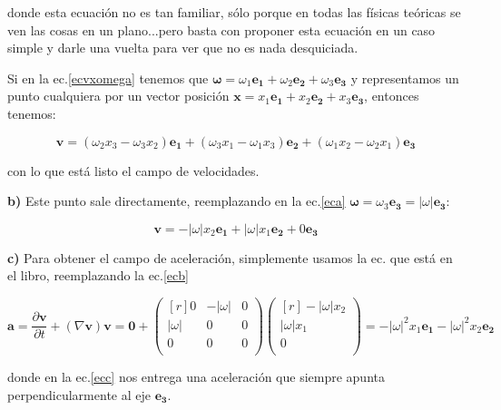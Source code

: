 \documentclass[10pt,a4paper]{article}
\begin{document}
\noindent donde esta ecuación no es tan familiar, sólo porque en todas las físicas teóricas se ven las cosas en un plano...pero basta con proponer esta ecuación en un caso simple y darle una vuelta para ver que no es nada desquiciada.

Si en la ec.\eqref{ecvxomega} tenemos que $\mathbf{\omega} =  \omega_1 \mathbf{e_1} + \omega_2 \mathbf{e_2} + \omega_3 \mathbf{e_3}$ y representamos un punto cualquiera por un vector posición $\mathbf{x} = x_1 \mathbf{e_1} + x_2 \mathbf{e_2} + x_3 \mathbf{e_3}$, entonces tenemos:

\begin{equation}\label{eca}
\mathbf{v} = (\omega_2 x_3 - \omega_3 x_2)\mathbf{e_1} + (\omega_3 x_1 - \omega_1 x_3) \mathbf{e_2} + (\omega_1 x_2 - \omega_2 x_1) \mathbf{e_3}
\end{equation}


\noindent con lo que está listo el campo de velocidades.

\medskip

\textbf{b)} Este punto sale directamente, reemplazando en la ec.\eqref{eca} $\mathbf{\omega} = \omega_3 \mathbf{e_3} = |\omega| \mathbf{e_3}$:

\begin{equation}\label{ecb}
\mathbf{v} = -|\omega| x_2 \mathbf{e_1} + |\omega| x_1 \mathbf{e_2} + 0 \mathbf{e_3}
\end{equation}

\medskip
\textbf{c)} Para obtener el campo de aceleración, simplemente usamos la ec. que está en el libro, reemplazando la ec.\eqref{ecb}

\begin{equation}\label{ecc}
\mathbf{a} = \frac{\partial \mathbf{v}}{\partial t} + (\nabla \mathbf{v})\mathbf{v} = \mathbf{0} +
\begin{pmatrix*}[r]
0 &  -|\omega| & 0 \\ 
|\omega| &  0 & 0 \\ 
0 &  0 & 0 \\ 
\end{pmatrix*}
\begin{pmatrix*}[r]
-|\omega| x_2  \\
|\omega| x_1 \\
0 \\
\end{pmatrix*}  =
-|\omega|^2 x_1 \mathbf{e_1} - |\omega|^2 x_2 \mathbf{e_2}  
\end{equation}

\noindent donde en la ec.\eqref{ecc} nos entrega una aceleración que siempre apunta perpendicularmente al eje $\mathbf{e_3}$.
\end{document}
